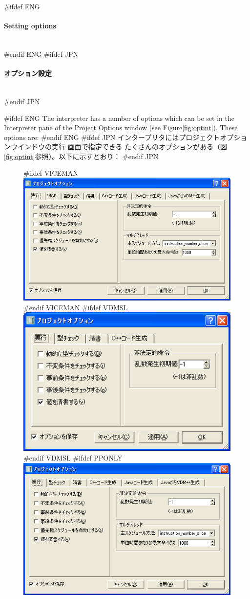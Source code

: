 \documentclass[\pformat,12pt]{article}
\newcommand{\subsubsubsection}[1]{\paragraph{#1}\mbox{}\\}
\newcommand{\guicmd}[1]{{\sf #1}}
\newcommand{\guicmd}[1]{{\gt #1}}
\begin{document}
#ifdef ENG
\subsubsubsection{Setting options}
#endif ENG
#ifdef JPN
\subsubsubsection{オプション設定}
#endif JPN


#ifdef ENG
The interpreter has a number of options which can be set in the 
\guicmd{Interpreter} pane of the \guicmd{Project Options} window (see
Figure\ref{fig:optint}). These options are:
#endif ENG
#ifdef JPN
インタープリタには\guicmd{プロジェクトオプション}ウインドウの\guicmd{実行} 画面で指定できる
たくさんのオプションがある（図\ref{fig:optint}参照）。以下に示すとおり：
#endif JPN

\begin{figure}[tbh]
\begin{center}
#ifdef VICEMAN
\includegraphics[width=12.5cm]{interpreterOptions-vice.png}
#endif VICEMAN
#ifdef VDMSL
\includegraphics[width=12.5cm]{interpreterOptions-sl.png}
#endif VDMSL
#ifdef PPONLY
\includegraphics[width=12.5cm]{interpreterOptions-pp.png}

\end{center}
\end{figure}
\end{document}
